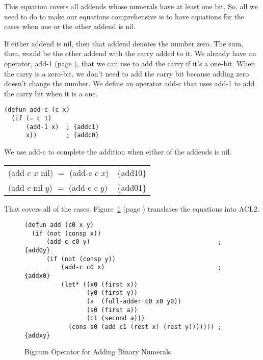 This equation covers all addends whose numerals have at least one bit.
So, all we need to do to make our equations comprehensive
is to have equations for the cases when one or the other addend is \textsf{nil}.

If either addend is \textsf{nil},
then that addend denotes the number zero.
The sum, then, would be the other addend with the carry added to it.
We already have an operator, \textsf{add-1} (page \pageref{add-1-defun}),
that we can use to add the carry if it's a one-bit.
When the carry is a zero-bit, we don't need to add the carry bit
because adding zero doesn't change the number.
We define an operator \textsf{add-c}
that uses \textsf{add-1} to add the carry bit
when it is a one.

\label{add-c-defun} 
\begin{code}
\begin{verbatim}
(defun add-c (c x)
  (if (= c 1)
      (add-1 x)  ; {addc1}
      x))        ; {addc0}
\end{verbatim}
\end{code}

We use \textsf{add-c }to complete the addition when either of the addends is \textsf{nil}.
\begin{center}
\begin{tabular}{ll}
\textsf{(add $c$ $x$ nil)} $=$ \textsf{(add-c $c$ $x$)}   & \{add10\} \\
\textsf{(add $c$ nil $y$)} $=$ \textsf{(add-c $c$ $y$)}   & \{add01\} \\
\end{tabular}
\end{center}

That covers all of the cases.
Figure~\ref{fig:bignum-add-defun} (page \pageref{fig:bignum-add-defun})
translates the equations into ACL2.

\begin{figure}
\begin{code}
\begin{verbatim}
(defun add (c0 x y)
  (if (not (consp x))
      (add-c c0 y)                                   ; {add0y}
      (if (not (consp y))
          (add-c c0 x)                               ; {addx0}
          (let* ((x0 (first x))
                 (y0 (first y))
                 (a  (full-adder c0 x0 y0))
                 (s0 (first a))
                 (c1 (second a)))
            (cons s0 (add c1 (rest x) (rest y))))))) ; {addxy}
\end{verbatim}
\end{code}
\caption{Bignum Operator for Adding Binary Numerals}
\label{fig:bignum-add-defun}
\end{figure}

